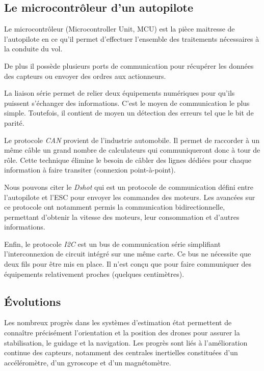  \subsection{Le microcontrôleur d'un autopilote}
 \label{sec:micoctrl}
 Le microcontrôleur (Microcontroller Unit, MCU)  est la pièce maitresse de l'autopilote en ce qu'il permet d'effectuer l'ensemble des traitements nécessaires à la conduite du vol.

 De plus il possède plusieurs ports de communication pour récupérer les données des capteurs ou envoyer des ordres aux actionneurs.



La liaison série permet de relier deux équipements numériques pour qu'ils puissent s'échanger des informations. C'est le moyen de communication le plus simple. Toutefois, il contient de moyen un détection des erreurs tel que le bit de parité.

 Le protocole \textit{CAN} provient de l'industrie automobile. Il permet de raccorder à un même câble un grand nombre de calculateurs qui communiqueront donc à tour de rôle. Cette technique élimine le besoin de câbler des lignes dédiées pour chaque information à faire transiter (connexion point-à-point).

 Nous pouvons citer le \textit{Dshot} qui est un protocole de communication défini entre l'autopilote et l'ESC pour envoyer les commandes des moteurs. Les avancées sur ce protocole ont notamment permis la communication bidirectionnelle, permettant d'obtenir la vitesse des moteurs, leur consommation et d'autres informations.

 Enfin, le protocole \textit{I2C} est un bus de communication série simplifiant l'interconnexion de circuit intégré sur une même carte. Ce bus ne nécessite que deux fils pour être mis en place. Il n'est conçu que pour faire communiquer des équipements relativement proches (quelques centimètres).

 \subsection{Évolutions}
 Les nombreux progrès dans les systèmes d'estimation état permettent de connaître précisément l'orientation et la position des drones pour assurer la stabilisation, le guidage et la navigation. Les progrès sont liés à l'amélioration continue des capteurs, notamment des centrales inertielles constituées d'un accéléromètre, d'un gyroscope et d'un magnétomètre.

